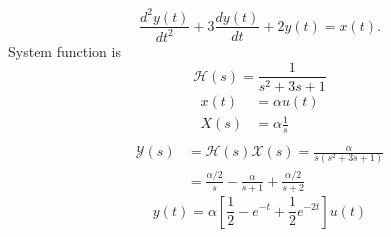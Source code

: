 \begin{frame}
    {
        \begin{equation*}
            \frac{d^2y(t)}{dt^2} + 3\frac{dy(t)}{dt} + 2y(t) = x(t).
        \end{equation*}
        System function is
        \begin{equation*}
            \mathcal{H}(s) = \frac{1}{s^2 + 3s + 1}
        \end{equation*}
        \pause
        \begin{align*}
          x(t) &= \alpha u(t)\\
          X(s) &= \alpha \frac{1}{s}\\
        \end{align*}
        \pause
        \begin{equation*}
            \begin{split}
            \mathcal{Y}(s) &=  \mathcal{H}(s)\mathcal{X}(s) = \frac{\alpha}{s(s^2 + 3s + 1)}\\
            &= \frac{\alpha/2}{s} - \frac{\alpha}{s+1} +\frac{\alpha/2}{s+2}
            \end{split}
        \end{equation*}
        \pause
        \begin{equation*}
            y(t) = \alpha \left[ \frac{1}{2} - e^{-t} + \frac{1}{2}e^{-2t}\right]u(t)
        \end{equation*}

    }
\end{frame}

